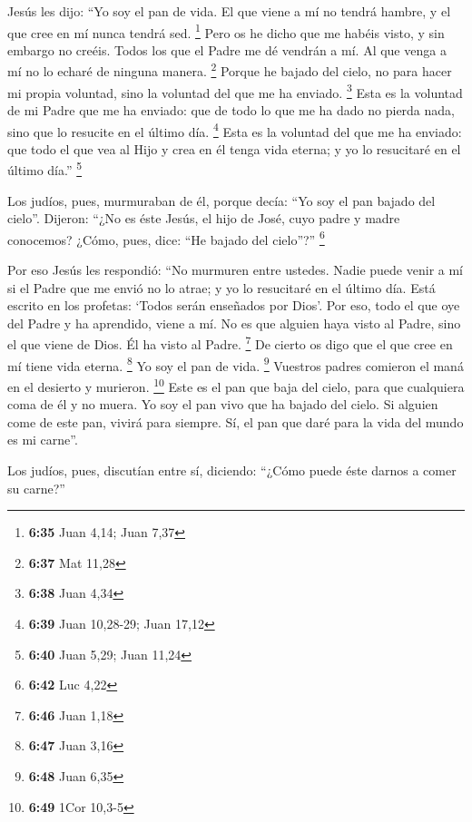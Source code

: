  Jesús les dijo: ``Yo soy el pan de vida. El que viene a
mí no tendrá hambre, y el que cree en mí nunca tendrá sed. \footnote{\textbf{6:35}
  Juan 4,14; Juan 7,37}  Pero os he dicho que me habéis
visto, y sin embargo no creéis.  Todos los que el Padre
me dé vendrán a mí. Al que venga a mí no lo echaré de ninguna manera.
\footnote{\textbf{6:37} Mat 11,28}  Porque he bajado del
cielo, no para hacer mi propia voluntad, sino la voluntad del que me ha
enviado. \footnote{\textbf{6:38} Juan 4,34}  Esta es la
voluntad de mi Padre que me ha enviado: que de todo lo que me ha dado no
pierda nada, sino que lo resucite en el último día. \footnote{\textbf{6:39}
  Juan 10,28-29; Juan 17,12}  Esta es la voluntad del que
me ha enviado: que todo el que vea al Hijo y crea en él tenga vida
eterna; y yo lo resucitaré en el último día.'' \footnote{\textbf{6:40}
  Juan 5,29; Juan 11,24}

 Los judíos, pues, murmuraban de él, porque decía: ``Yo
soy el pan bajado del cielo''.  Dijeron: ``¿No es éste
Jesús, el hijo de José, cuyo padre y madre conocemos? ¿Cómo, pues, dice:
``He bajado del cielo''?'' \footnote{\textbf{6:42} Luc 4,22}

 Por eso Jesús les respondió: ``No murmuren entre
ustedes.  Nadie puede venir a mí si el Padre que me envió
no lo atrae; y yo lo resucitaré en el último día.  Está
escrito en los profetas: `Todos serán enseñados por Dios'. Por eso, todo
el que oye del Padre y ha aprendido, viene a mí.  No es
que alguien haya visto al Padre, sino el que viene de Dios. Él ha visto
al Padre. \footnote{\textbf{6:46} Juan 1,18}  De cierto
os digo que el que cree en mí tiene vida eterna. \footnote{\textbf{6:47}
  Juan 3,16}  Yo soy el pan de vida. \footnote{\textbf{6:48}
  Juan 6,35}  Vuestros padres comieron el maná en el
desierto y murieron. \footnote{\textbf{6:49} 1Cor 10,3-5}
 Este es el pan que baja del cielo, para que cualquiera
coma de él y no muera.  Yo soy el pan vivo que ha bajado
del cielo. Si alguien come de este pan, vivirá para siempre. Sí, el pan
que daré para la vida del mundo es mi carne''.

 Los judíos, pues, discutían entre sí, diciendo: ``¿Cómo
puede éste darnos a comer su carne?''

